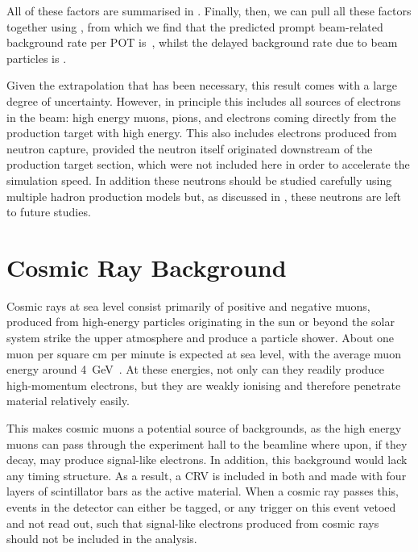 \TabBgBeamFactors
All of these factors are summarised in .
Finally, then, we can pull all these factors together using , from which we find that the predicted prompt beam-related background rate per POT is~\VarBeamBgPromptPerPOT, whilst the delayed background rate due to beam particles is \VarBeamBgDelayedPerPOT.

Given the extrapolation that has been necessary, this result comes with a large degree of uncertainty.
However, in principle this includes all sources of electrons in the beam: high energy muons, pions, and electrons coming directly from the production target with high energy.
This also includes electrons produced from neutron capture, provided the neutron itself originated downstream of the production target section, which were not included here in order to accelerate the simulation speed.
In addition these neutrons should be studied carefully using multiple hadron production models but, as discussed in , these neutrons are left to future studies.

\section{Cosmic Ray Background}
\FigBgCosmicPrimary
Cosmic rays at sea level consist primarily of positive and negative muons, produced from high-energy particles originating in the sun or beyond the solar system strike the upper atmosphere and produce a particle shower.
About one muon per square cm per minute is expected at sea level, with the average muon energy around 4~GeV~\cite{PDG2014}.
At these energies, not only can they readily produce high-momentum electrons, but they are weakly ionising and therefore penetrate material relatively easily.

This makes cosmic muons a potential source of backgrounds, as the high energy muons can pass through the experiment hall to the beamline where upon, if they decay, may produce signal-like electrons.
In addition, this background would lack any timing structure.
As a result, a  \ac{CRV} is included in both \phaseI and \phaseII made with four layers of scintillator bars as the active material.
When a cosmic ray passes this, events in the detector can either be tagged, or any trigger on this event vetoed and not read out, such that signal-like electrons produced from cosmic rays should not be included in the analysis.

